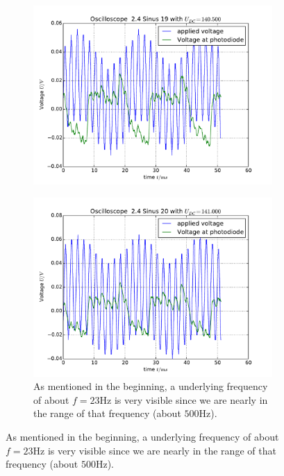 \begin{figure}
\begin{subfigure}[b]{\picwidth}
        \includegraphics[width=\textwidth]{analysis/figures/24sinus19}
        \caption{}
    \end{subfigure}
    \begin{subfigure}[b]{\picwidth}
        \includegraphics[width=\textwidth]{analysis/figures/24sinus20}
        \caption{As mentioned in the beginning, a underlying
            frequency of about $f=23$Hz is very visible since 
            we are nearly in the range of that frequency (about
                $500$Hz).}
    \end{subfigure}
\label{fig:sinus10}
\end{figure}
\clearpage
